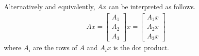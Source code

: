 Alternatively and equivalently, $Ax$ can be interpreted as follows.
\begin{eqnarray}
  Ax = \left[\begin{array}{c}
                 A_1 \\
                 A_2 \\
                 A_3 
               \end{array}\right]x = \left[\begin{array}{c}
                                             A_1x \\
                                             A_2x \\
                                             A_3x 
                                           \end{array}\right] \nonumber
\end{eqnarray}
where $A_i$ are the rows of $A$ and $A_ix$ is the dot product.
